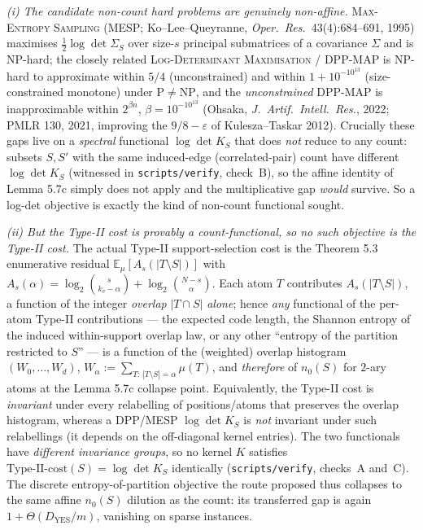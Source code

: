 \documentclass[
]{article}
\begin{document}
\emph{(i) The candidate non-count hard problems are genuinely non-affine.}
\textsc{Max-Entropy Sampling} (MESP; Ko--Lee--Queyranne, \emph{Oper.\ Res.}\
43(4):684--691, 1995) maximises $\tfrac12\log\det\Sigma_S$ over size-$s$
principal submatrices of a covariance $\Sigma$ and is NP-hard; the closely
related \textsc{Log-Determinant Maximisation} / DPP-MAP is NP-hard to
approximate within $5/4$ (unconstrained) and within $1+10^{-10^{13}}$
(size-constrained monotone) under $\mathrm P\neq\mathrm{NP}$, and the
\emph{unconstrained} DPP-MAP is inapproximable within $2^{\beta n}$,
$\beta=10^{-10^{13}}$ (Ohsaka, \emph{J.\ Artif.\ Intell.\ Res.}, 2022;
PMLR 130, 2021, improving the $9/8-\varepsilon$ of Kulesza--Taskar 2012).
Crucially these gaps live on a \emph{spectral} functional $\log\det K_S$
that does \emph{not} reduce to any count: subsets $S,S'$ with the same
induced-edge (correlated-pair) count have different $\log\det K_S$
(witnessed in \texttt{scripts/verify}, check~B), so the affine identity of
Lemma 5.7c simply does not apply and the multiplicative gap \emph{would}
survive. So a log-det objective is exactly the kind of non-count functional
sought.

\emph{(ii) But the Type-II cost is provably a count-functional, so no such
objective is the Type-II cost.} The actual Type-II support-selection cost
is the Theorem 5.3 enumerative residual
$\mathbb E_\mu[A_s(|T\setminus S|)]$ with
$A_s(\alpha)=\log_2\binom{s}{k_v-\alpha}+\log_2\binom{N-s}{\alpha}$. Each
atom $T$ contributes $A_s(|T\setminus S|)$, a function of the integer
\emph{overlap} $|T\cap S|$ \emph{alone}; hence \emph{any} functional of the
per-atom Type-II contributions --- the expected code length, the Shannon
entropy of the induced within-support overlap law, or any other
``entropy of the partition restricted to $S$'' --- is a function of the
(weighted) overlap histogram $(W_0,\dots,W_d)$, $W_\alpha:=\sum_{T:\,
|T\setminus S|=\alpha}\mu(T)$, and \emph{therefore} of $n_0(S)$ for
$2$-ary atoms at the Lemma 5.7c collapse point. Equivalently, the Type-II
cost is \emph{invariant} under every relabelling of positions/atoms that
preserves the overlap histogram, whereas a DPP/MESP $\log\det K_S$ is
\emph{not} invariant under such relabellings (it depends on the off-diagonal
kernel entries). The two functionals have \emph{different invariance
groups}, so no kernel $K$ satisfies $\text{Type-II-cost}(S)=\log\det K_S$
identically (\texttt{scripts/verify}, checks~A and~C). The discrete
entropy-of-partition objective the route proposed thus collapses to the
same affine $n_0(S)$ dilution as the count: its transferred gap is again
$1+\Theta(D_{\mathrm{YES}}/m)$, vanishing on sparse instances.
\end{document}
